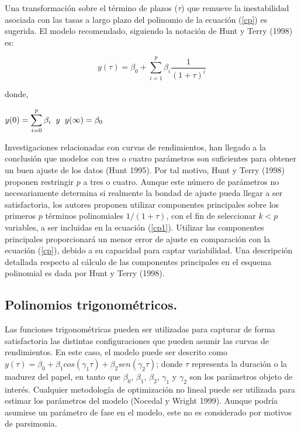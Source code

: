 \hspace*{0.4 cm} Una transformaci\'on sobre el t\'ermino de plazos ($\tau$) que remueve la
inestabilidad asociada con las tasas a largo plazo del polinomio de la ecuaci\'on (\ref{cp}) es
sugerida. El modelo recomendado, siguiendo la notaci\'on de Hunt y
Terry (1998) es:

\begin{equation}
y(\tau) = \beta_{0} + \sum_{i=1}^{p} \beta_{i} \frac{1}{(1+\tau)^i}
\label{cp1}
\end{equation} 

\noindent donde,

\begin{center}
$\displaystyle{y(0) = \sum_{i=0}^{p}\beta_{i} \hspace*{0.2 cm} y \hspace*{0.2 cm} y(\infty) = \beta_{0}   }$
\end{center} 

\vspace*{0.2 cm}

\hspace*{0.4 cm}Investigaciones relacionadas con curvas de rendimientos, han llegado a
la conclusi\'on que modelos con tres o cuatro par\'ametros son suficientes
para obtener un buen ajuste de los datos (Hunt 1995). Por tal motivo,
Hunt y Terry (1998) proponen restringir $p$ a tres o cuatro. Aunque este
n\'umero de par\'ametros no necesariamente determina si realmente la
bondad de ajuste pueda llegar a ser satisfactoria, los autores proponen
utilizar componentes principales sobre los primeros $p$ t\'erminos
polinomiales $1/(1 + \tau)$, con el fin de seleccionar $k<p$ variables, a ser
incluidas en la ecuaci\'on (\ref{cp1}). Utilizar las componentes principales
proporcionar\'a un menor error de ajuste en comparaci\'on con la ecuaci\'on (\ref{cp}),
debido a su capacidad para captar variabilidad. Una descripci\'on
detallada respecto al c\'alculo de las componentes principales en el
esquema polinomial es dada por Hunt y Terry (1998).

\subsection{Polinomios trigonom\'etricos.\\}



\hspace*{0.4 cm} Las funciones trigonom\'etricas pueden ser utilizadas para capturar de
forma satisfactoria las distintas configuraciones que pueden asumir las
curvas de rendimientos. En este caso, el modelo puede ser descrito como
$y(\tau) = \beta_{0} + \beta_{1}cos(\gamma_{1}\tau) + \beta_{2}sen(\gamma_{2}\tau)$; donde $\tau$ representa la duraci\'on o la
madurez del papel, en tanto que $\beta_{0}$, $\beta_{1}$, $\beta_{2}$, $\gamma_{1}$ y $\gamma_{2}$ son los par\'ametros
objeto de inter\'es. Cualquier metodolog\'ia de optimizaci\'on no lineal puede
ser utilizada para estimar los par\'ametros del modelo (Nocedal y Wright
1999). Aunque podr\'ia asumirse un par\'ametro de fase en el modelo, este
no es considerado por motivos de parsimonia.

